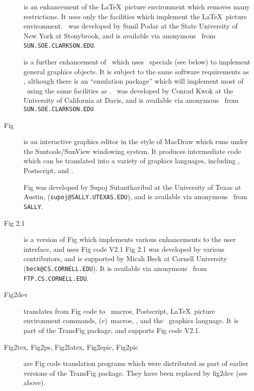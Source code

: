 \begin{description}

\item[\EPIC]
	is an enhancement of the \LaTeX\ picture environment which
	removes many restrictions.
It uses only the facilities which implement the \LaTeX\ picture environment.
\EPIC\ was developed by Sunil Podar at the State University of New York
	at Stonybrook, and is available via anonymous
	\FTP\ from {\tt SUN.SOE.CLARKSON.EDU}.

\item[\EEPIC]
	is a further enhancement of \EPIC\ which uses \tpic\ specials
	(see below) to implement general graphics objects.
It is subject to the same software requirements as \tpic,
	although there is an ``emulation package'' which will
	implement most of \EEPIC\ using the same facilities as \EPIC.
\EEPIC\ was developed by Conrad Kwok at the University of California at Davis,
	and is available via anonymous \FTP\  from {\tt SUN.SOE.CLARKSON.EDU}

\item[Fig]
	is an interactive graphics editor in the style of MacDraw
	which runs under the Suntools/SunView windowing system.
It produces intermediate code which can be translated into
	a variety of graphics languages, including \PIC, Postscript,
	and \PicTeX.

Fig was developed by Supoj Sutanthavibul at the University of Texas at Austin,
	({\tt supoj@SALLY.UTEXAS.EDU}), and is available via anonymous
	\FTP\  from {\tt SALLY}.

\item[Fig 2.1]
	is a version of Fig which implements various
	enhancements to the user interface, and uses Fig code V2.1
Fig 2.1 was developed by various contributors, and is supported by Micah Beck
	at Cornell University ({\tt beck@CS.CORNELL.EDU}).
It is available via anonymous \FTP\ from {\tt FTP.CS.CORNELL.EDU}.

\item[Fig2dev]
	translates  from Fig code to \PicTeX\ macros, Postscript,
	\LaTeX\ picture environment commands, {\sc (e)}\EPIC\ macros, \textyl,
	and the \PIC\ graphics language.
It is part of the TransFig package, and supports Fig code V2.1.

\item[Fig2tex, Fig2ps, Fig2latex, Fig2epic, Fig2pic]
	are Fig code translation programs which were distributed as
	part of earlier versions of the TransFig package.
They have been replaced by fig2dev (see above).


\end{description}
